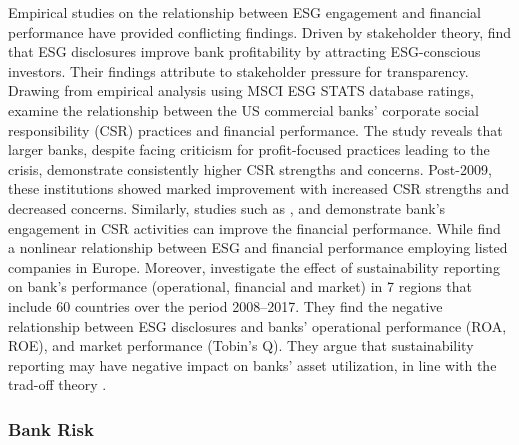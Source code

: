 \documentclass[
  authoryear]{elsarticle}
\begin{document}
Empirical studies on the relationship between ESG engagement and
financial performance have provided conflicting findings. Driven by
stakeholder theory, \citet{WU2013} find that ESG disclosures improve
bank profitability by attracting ESG-conscious investors. Their findings
attribute to stakeholder pressure for transparency. Drawing from
empirical analysis using MSCI ESG STATS database ratings,
\citet{CORNETT2016} examine the relationship between the US commercial
banks' corporate social responsibility (CSR) practices and financial
performance. The study reveals that larger banks, despite facing
criticism for profit-focused practices leading to the crisis,
demonstrate consistently higher CSR strengths and concerns. Post-2009,
these institutions showed marked improvement with increased CSR
strengths and decreased concerns. Similarly, studies such as
\citet{CARNEVALE2014}, \citet{SHEN2016} and \citet{BUALLAY2021}
demonstrate bank's engagement in CSR activities can improve the
financial performance. While \citet{FERRERO2016} find a nonlinear
relationship between ESG and financial performance employing listed
companies in Europe. Moreover, \citet{BUALLAY2023} investigate the
effect of sustainability reporting on bank's performance (operational,
ﬁnancial and market) in 7 regions that include 60 countries over the
period 2008--2017. They find the negative relationship between ESG
disclosures and banks' operational performance (ROA, ROE), and market
performance (Tobin's Q). They argue that sustainability reporting may
have negative impact on banks' asset utilization, in line with the
trad-off theory \citep[see][]{LEE2009}.

\subsubsection{Bank Risk}\label{bank-risk}
\end{document}
